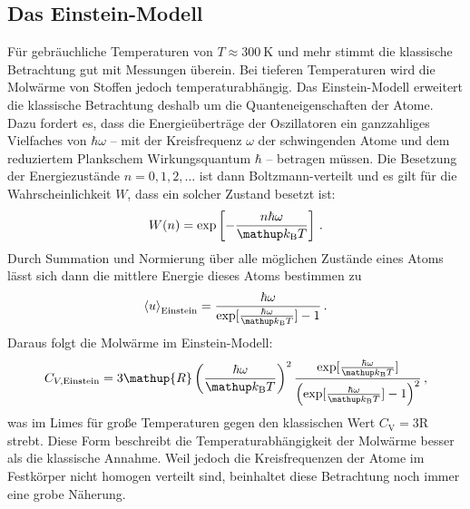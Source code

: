 \subsection{Das Einstein-Modell}
\label{subsec:einstein}
Für gebräuchliche Temperaturen von $T \approx \SI{300}{\kelvin}$ und mehr
stimmt die klassische Betrachtung gut mit Messungen überein.
Bei tieferen Temperaturen wird die Molwärme von Stoffen jedoch
temperaturabhängig.
Das Einstein-Modell erweitert die klassische Betrachtung deshalb um die
Quanteneigenschaften der Atome. Dazu fordert es, dass die Energieüberträge
der Oszillatoren ein ganzzahliges Vielfaches von $\hbar\omega$ -- mit
der Kreisfrequenz $\omega$ der schwingenden Atome und dem reduziertem Plankschem Wirkungsquantum $\hbar$ -- betragen müssen.
Die Besetzung der Energiezustände $n = 0,1,2,\dots$ ist dann Boltzmann-verteilt
und es gilt für die Wahrscheinlichkeit $W$, dass ein solcher Zustand besetzt
ist:
\begin{equation}
    \label{eqn:boltzmann}
    W(n) = \exp\left[-\frac{n\hbar\omega}{\kb T}\right]\,.
\end{equation}
Durch Summation und Normierung über alle möglichen Zustände eines Atoms
lässt sich dann die mittlere Energie dieses Atoms bestimmen zu
\begin{equation}
    \label{eqn:u_einstein}
    \left<u\right>_\text{Einstein} =
    \frac{\hbar\omega}{\exp[\frac{\hbar\omega}{\kb T}] - 1}\,.
\end{equation}
Daraus folgt die Molwärme im Einstein-Modell:
\begin{equation}
    \label{eqn:cv_einstein}
    C_{V,\text{Einstein}} =
    3\mathup{R}\left(\frac{\hbar\omega}{\kb T}\right)^2
    \frac{
        \exp[\frac{\hbar\omega}{\kb T}]
    }{
        \left(\exp[\frac{\hbar\omega}{\kb T}] - 1\right)^2
    }\,,
\end{equation}
was im Limes für große Temperaturen gegen den klassischen Wert
$C_\mathrm{V} = 3\mathup{R}$ strebt.
Diese Form beschreibt die Temperaturabhängigkeit der Molwärme besser als
die klassische Annahme. Weil jedoch die Kreisfrequenzen der Atome im Festkörper
nicht homogen verteilt sind, beinhaltet diese Betrachtung noch immer eine grobe
Näherung.

